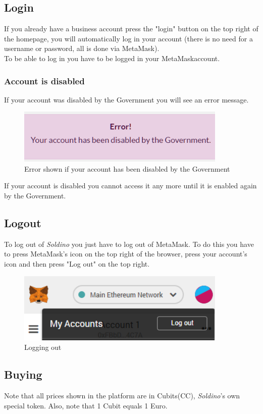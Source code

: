 	\subsection{Login}
	If you already have a business account press the "login" button on the 
	top right of the homepage, you will automatically log in your account 
	(there is no need for a username or password, all is done via MetaMask). 
	\\To be able to log in you have to be logged in your MetaMask\glosp account.
		\subsubsection{Account is disabled}
		If your account was disabled by the Government you will see an error 
		message.
		\begin{figure}[H]
			\includegraphics[width=10cm]{res/images/user_disabled.png}
			\centering
			\caption{Error shown if your account has been disabled by the Government}
		\end{figure}
	\noindent If your account is disabled you cannot access it any more until it 
	is enabled again by the Government.
	\subsection{Logout}
	To log out of \textit{Soldino} you just have to log out of 
	MetaMask\glosp. To do this you have to press MetaMask's icon on the top 
	right of the browser, press your account's icon and then press "Log out"
	on the top right.
	\begin{figure}[H]
		\includegraphics[width=10cm]{res/images/logout_metamask.png}
		\centering
		\caption{Logging out}
	\end{figure}
	\subsection{Buying}
	Note that all prices shown in the platform are in Cubits\glosp (CC\glo), 
	\textit{Soldino}'s own special token. Also, note that 1 Cubit equals 1 Euro.
